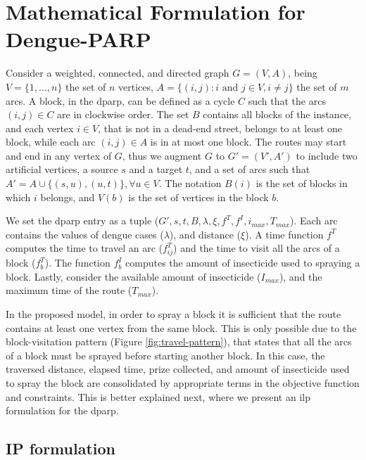 \documentclass[a4paper,11pt]{article}
\begin{document}
\section{Mathematical Formulation for Dengue-PARP} \label{sec:formulation}

Consider a weighted, connected, and directed graph $G = (V, A)$, being $V = \{1,
\dots, n\}$ the  set of $n$ vertices, $A =  \{(i, j): i \text{ and }  j \in V, i
\neq j\}$ the set of $m$ arcs. A  block, in the \gls{dparp}, can be defined as a
cycle $C$ such that the arcs $(i, j)  \in C$ are in clockwise order. The set $B$
contains all blocks of the instance, and each vertex $i \in V$, that is not in a
dead-end street, belongs to at least one block, while each arc $(i, j) \in A$ is
in at most one block. The routes may start and end in any vertex of $G$, thus we
augment $G$ to $G' = (V', A')$  to include two artificial vertices, a source $s$
and a target $t$, and  a set of arcs such that $A' = A  \cup \{(s, u), (u, t)\},
\forall u \in V$. The notation $B(i)$ is the set of blocks in which $i$ belongs,
and $V(b)$ is the set of vertices in the block $b$.

We set the \gls{dparp}  entry as a tuple ($G', s, t, B,  \lambda, \xi, f^T, f^I,
i_{max}, T_{max}$).  Each arc contains  the values of dengue  cases ($\lambda$),
and distance ($\xi$). A  time function $f^T$ computes the time  to travel an arc
($f^T_{ij}$)  and the  time to  visit all  the arcs  of a  block ($f^T_b$).  The
function $f^I_b$  computes the amount of  insecticide used to spraying  a block.
Lastly,  consider  the available  amount  of  insecticide ($I_{max}$),  and  the
maximum time of the route ($T_{max}$).

In the proposed model, in order to spray a block it is sufficient that the route
contains at least one  vertex from the same block. This is  only possible due to
the block-visitation pattern (Figure \ref{fig:travel-pattern}), that states that
all the arcs of  a block must be sprayed before starting  another block. In this
case,  the traversed  distance, elapsed  time,  prize collected,  and amount  of
insecticide used to spray the block are consolidated by appropriate terms in the
objective  function and  constraints. This  is better  explained next,  where we
present an \gls{ilp} formulation for the \gls{dparp}.
\newline

\subsection{IP formulation}
\end{document}
